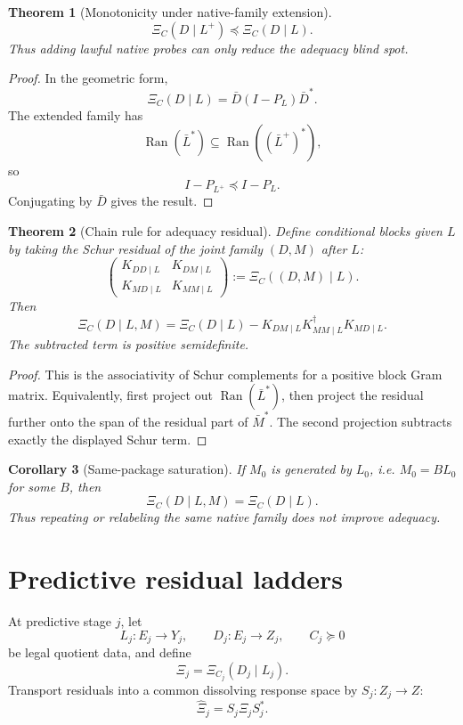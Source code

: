 \documentclass[11pt]{article}
\newtheorem{theorem}{Theorem}[section]
\newtheorem{corollary}[theorem]{Corollary}
\newcommand{\Ran}{\operatorname{Ran}}
\begin{document}
\begin{theorem}[Monotonicity under native-family extension]
\[
\boxed{
\Xi_C(D\mid L^+)\preceq \Xi_C(D\mid L).
}
\]
Thus adding lawful native probes can only reduce the adequacy blind spot.
\end{theorem}

\begin{proof}
In the geometric form,
\[
\Xi_C(D\mid L)=\bar D(I-P_L)\bar D^*.
\]
The extended family has
\[
\Ran(\bar L^*)\subseteq \Ran((\bar L^+)^*),
\]
so
\[
I-P_{L^+}\preceq I-P_L.
\]
Conjugating by $\bar D$ gives the result.
\end{proof}

\begin{theorem}[Chain rule for adequacy residual]
Define conditional blocks given $L$ by taking the Schur residual of the joint family $(D,M)$ after $L$:
\[
\begin{pmatrix}
K_{DD\mid L}&K_{DM\mid L}\\
K_{MD\mid L}&K_{MM\mid L}
\end{pmatrix}
:=
\Xi_C((D,M)\mid L).
\]
Then
\[
\boxed{
\Xi_C(D\mid L,M)
=
\Xi_C(D\mid L)
-
K_{DM\mid L}K_{MM\mid L}^{\dagger}K_{MD\mid L}.
}
\]
The subtracted term is positive semidefinite.
\end{theorem}

\begin{proof}
This is the associativity of Schur complements for a positive block Gram matrix.  Equivalently, first project out $\Ran(\bar L^*)$, then project the residual further onto the span of the residual part of $\bar M^*$.  The second projection subtracts exactly the displayed Schur term.
\end{proof}

\begin{corollary}[Same-package saturation]
If $M_0$ is generated by $L_0$, i.e. $M_0=BL_0$ for some $B$, then
\[
\Xi_C(D\mid L,M)=\Xi_C(D\mid L).
\]
Thus repeating or relabeling the same native family does not improve adequacy.
\end{corollary}

\section{Predictive residual ladders}

At predictive stage $j$, let
\[
L_j:E_j\to Y_j,
\qquad
D_j:E_j\to Z_j,
\qquad
C_j\succeq0
\]
be legal quotient data, and define
\[
\Xi_j=\Xi_{C_j}(D_j\mid L_j).
\]
Transport residuals into a common dissolving response space by $S_j:Z_j\to Z$:
\[
\widehat\Xi_j=S_j\Xi_jS_j^*.
\]
\end{document}
